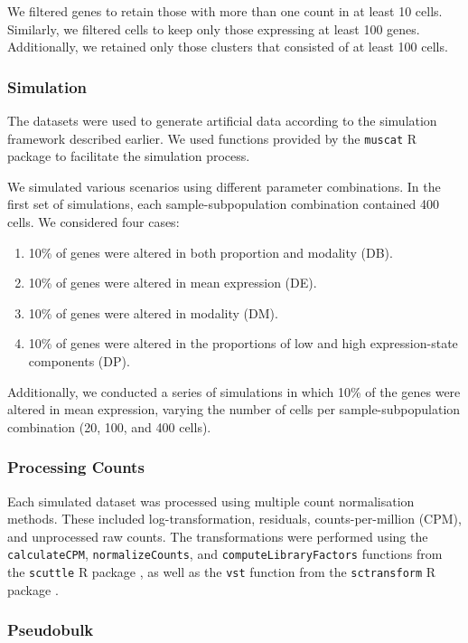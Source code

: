 \documentclass[a4paper, 11pt, twocolumn]{article}
\begin{document}
\begin{multicols}{2}
We filtered genes to retain those with more than one count in at least 10 cells. Similarly, we filtered cells to keep only those expressing at least 100 genes. Additionally, we retained only those clusters that consisted of at least 100 cells.

\subsubsection{Simulation}

The datasets were used to generate artificial data according to the simulation framework described earlier. We used functions provided by the \texttt{muscat} R package \citep{muscat} to facilitate the simulation process.

We simulated various scenarios using different parameter combinations. In the first set of simulations, each sample-subpopulation combination contained 400 cells. We considered four cases:
\begin{enumerate}[itemsep=0pt, topsep=0pt]
	\item 10\% of genes were altered in both proportion and modality (DB).
	\item 10\% of genes were altered in mean expression (DE).
	\item 10\% of genes were altered in modality (DM).
	\item 10\% of genes were altered in the proportions of low and high expression-state components (DP).
\end{enumerate}

Additionally, we conducted a series of simulations in which 10\% of the genes were altered in mean expression, varying the number of cells per sample-subpopulation combination (20, 100, and 400 cells).

\subsubsection{Processing Counts}

Each simulated dataset was processed using multiple count normalisation methods. These included log-transformation, residuals, counts-per-million (CPM), and unprocessed raw counts. The transformations were performed using the \texttt{calculateCPM}, \texttt{normalizeCounts}, and \texttt{computeLibraryFactors} functions from the \texttt{scuttle} R package \citep{scatter}, as well as the \texttt{vst} function from the \texttt{sctransform} R package \citep{sctrans}.

\subsubsection{Pseudobulk}


\end{multicols}
\end{document}
